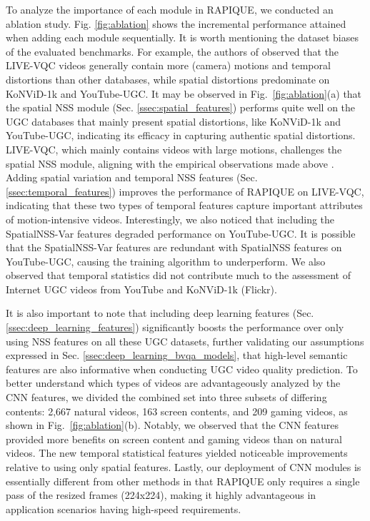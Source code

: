\documentclass[transmag]{IEEEtran}
\begin{document}
To analyze the importance of each module in RAPIQUE, we conducted an ablation study. Fig. \ref{fig:ablation} shows the incremental performance attained when adding each module sequentially. It is worth mentioning the dataset biases of the evaluated benchmarks. For example, the authors of \cite{tu2020ugc} observed that the LIVE-VQC videos generally contain more (camera) motions and temporal distortions than other databases, while spatial distortions predominate on KoNViD-1k and YouTube-UGC. It may be observed in Fig.~\ref{fig:ablation}(a) that the spatial NSS module (Sec. \ref{ssec:spatial_features}) performs quite well on the UGC databases that mainly present spatial distortions, like KoNViD-1k and YouTube-UGC, indicating its efficacy in capturing authentic spatial distortions. LIVE-VQC, which mainly contains videos with large motions, challenges the spatial NSS module, aligning with the empirical observations made above \cite{tu2020ugc}. Adding spatial variation and temporal NSS features (Sec. \ref{ssec:temporal_features}) improves the performance of RAPIQUE on LIVE-VQC, indicating that these two types of temporal features capture important attributes of motion-intensive videos. Interestingly, we also noticed that including the SpatialNSS-Var features degraded performance on YouTube-UGC. It is possible that the SpatialNSS-Var features are redundant with SpatialNSS features on YouTube-UGC, causing the training algorithm to underperform. We also observed that temporal statistics did not contribute much to the assessment of Internet UGC videos from YouTube and KoNViD-1k (Flickr).

It is also important to note that including deep learning features (Sec. \ref{ssec:deep_learning_features}) significantly boosts the performance over only using NSS features on all these UGC datasets, further validating our assumptions expressed in Sec. \ref{ssec:deep_learning_bvqa_models}, that high-level semantic features are also informative when conducting UGC video quality prediction. To better understand which types of videos are advantageously analyzed by the CNN features, we divided the combined set into three subsets of differing contents: 2,667 natural videos, 163 screen contents, and 209 gaming videos, as shown in Fig.~\ref{fig:ablation}(b). Notably, we observed that the CNN features provided more benefits on screen content and gaming videos than on natural videos. The new temporal statistical features yielded noticeable improvements relative to using only spatial features. Lastly, our deployment of CNN modules is essentially different from other methods \cite{hosu2020koniq, ying2019patches} in that RAPIQUE only requires a single pass of the resized frames (224x224), making it highly advantageous in application scenarios having high-speed requirements.
\end{document}
